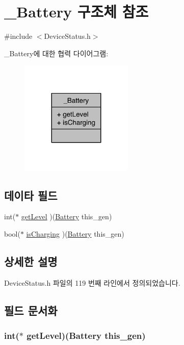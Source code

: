 \hypertarget{struct___battery}{\section{\-\_\-\-Battery 구조체 참조}
\label{struct___battery}
}


{\ttfamily \#include $<$Device\-Status.\-h$>$}



\-\_\-\-Battery에 대한 협력 다이어그램\-:\nopagebreak
\begin{figure}[H]
\begin{center}
\leavevmode
\includegraphics[width=152pt]{d8/d97/struct___battery__coll__graph}
\end{center}
\end{figure}
\subsection*{데이타 필드}
\begin{DoxyCompactItemize}
\item 
int($\ast$ \hyperlink{struct___battery_a6321988705fe01fbbd13ed44645920ce}{get\-Level} )(\hyperlink{namespace_3global_scope_4_de/d4d/struct_battery}{Battery} this\-\_\-gen)
\item 
bool($\ast$ \hyperlink{struct___battery_a58bd0a8a8a168cad5a323b2cef48f161}{is\-Charging} )(\hyperlink{namespace_3global_scope_4_de/d4d/struct_battery}{Battery} this\-\_\-gen)
\end{DoxyCompactItemize}


\subsection{상세한 설명}


Device\-Status.\-h 파일의 119 번째 라인에서 정의되었습니다.



\subsection{필드 문서화}
\hypertarget{struct___battery_a6321988705fe01fbbd13ed44645920ce}{
\subsubsection[{get\-Level}]{\setlength{\rightskip}{0pt plus 5cm}int($\ast$  get\-Level)({\bf Battery} this\-\_\-gen)}}\label{struct___battery_a6321988705fe01fbbd13ed44645920ce}


